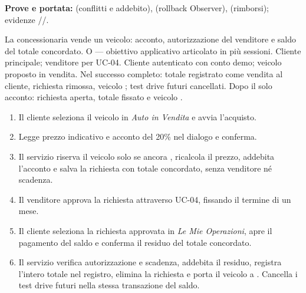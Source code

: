 \begin{flushleft}\noindent\textbf{Prove e portata:}  (conflitti e addebito),  (rollback Observer),  (rimborsi); evidenze //.\end{flushleft}
\clearpage
{}
{La concessionaria vende un veicolo: acconto, autorizzazione del venditore e saldo del totale concordato.}
{O --- obiettivo applicativo articolato in pi\`u sessioni.}
{Cliente principale; venditore per UC-04.}
{Cliente autenticato con conto demo; veicolo proposto in vendita.}
{Nel successo completo: totale registrato come vendita al cliente,
richiesta rimossa, veicolo ; test drive futuri cancellati.
Dopo il solo acconto: richiesta  aperta, totale fissato e veicolo .}
\principale
\begin{enumerate}
\item Il cliente seleziona il veicolo in \emph{Auto in Vendita} e avvia l'acquisto.
\item Legge prezzo indicativo e acconto del 20\% nel dialogo e conferma.
\item Il servizio riserva il veicolo solo se ancora , ricalcola il prezzo,
  addebita l'acconto e salva la richiesta con totale concordato, senza venditore n\'e scadenza.
\item Il venditore approva la richiesta attraverso UC-04, fissando il termine di un mese.
\item Il cliente seleziona la richiesta approvata in \emph{Le Mie Operazioni},
  apre il pagamento del saldo e conferma il residuo del totale concordato.
\item Il servizio verifica autorizzazione e scadenza, addebita il residuo,
  registra l'intero totale nel registro, elimina la richiesta e porta il veicolo a .
  Cancella i test drive futuri nella stessa transazione del saldo.
\end{enumerate}
\alternative
